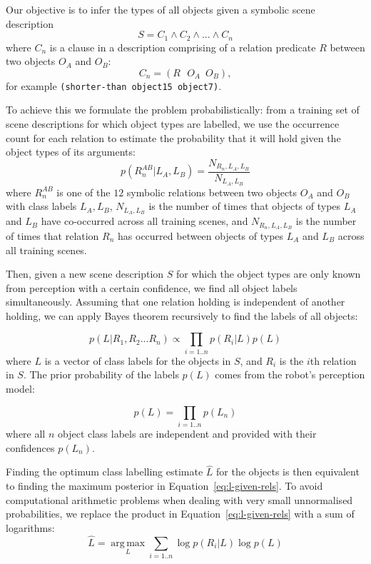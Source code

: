 \documentclass[letterpaper]{article}
\begin{document}
Our objective is to infer the types of all objects given a symbolic scene description 
\begin{equation}
  S=C_1 \wedge C_2 \wedge ... \wedge C_n
\end{equation}
where $C_n$ is a clause in a description comprising of a relation predicate $R$ between two objects $O_A$ and $O_B$:
\begin{equation}
C_n = (R\,\,\,\, O_A\,\,\, O_B),
\end{equation}
for example \texttt{(shorter-than object15 object7)}.

To achieve this we formulate the problem probabilistically: from a training set of scene descriptions for which object types are labelled, we use the occurrence count for each relation to estimate the probability that it will hold given the object types of its arguments:
\begin{equation}
p(R_n^{AB} | L_A, L_B)=\frac{N_{R_n,L_A,L_B}}{N_{L_A,L_B}}
\end{equation}
where $R_n^{AB}$ is one of the $12$ symbolic relations between two objects $O_A$ and $O_B$ with class labels  $L_A, L_B$, $N_{L_A,L_B}$ is the number of times that objects of types $L_A$ and $L_B$ have co-occurred across all training scenes, and $N_{R_n,L_A,L_B}$ is the number of times that relation $R_n$ has occurred between objects of types $L_A$ and $L_B$ across all training scenes.

Then, given a new scene description $S$ for which the object types are only known from perception with a certain confidence, we find all object labels simultaneously. Assuming that one relation holding is independent of another holding, we can apply Bayes theorem recursively to find the labels of all objects:

\begin{equation}\label{eq:l-given-rels}
p(L | R_1, R_2 ... R_n) \propto \prod_{i=1..n} p(R_i | L) p(L)
\end{equation}
where $L$ is a vector of class labels for the objects in $S$, and $R_i$ is the $i$th relation in $S$. The prior probability of the labels $p(L)$ comes from the robot's perception model: 

\begin{equation}
p(L)=\prod_{i=1..n}p(L_n)
\end{equation}
where all $n$ object class labels are independent and provided with their confidences $p(L_n)$.

Finding the optimum class labelling estimate $\hat{L}$ for the objects is then equivalent to finding the maximum posterior in Equation~\ref{eq:l-given-rels}. To avoid computational arithmetic problems when dealing with very small unnormalised probabilities, we replace the product in Equation~\ref{eq:l-given-rels} with a sum of logarithms:
\begin{equation}
\hat{L}=\operatorname*{arg\,max}_L \sum_{i=1..n} \log p(R_i | L)  \log p(L)
\end{equation}
\end{document}
